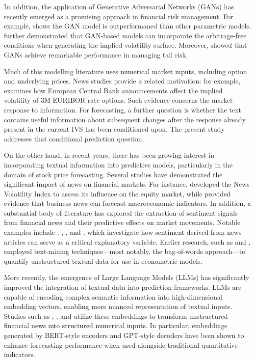 In addition, the application of Generative Adversarial Networks (GANs) has recently emerged as a promising approach in financial risk management. For example, \cite{ge2025gan} shows the GAN model is outperformaned than other parametric models. \cite{vuletic2024volgan} further demonstrated that GAN-based models can incorporate the arbitrage-free conditions when generating the implied volatility surface. Moreover, \cite{cont2025tail} showed that GANs achieve remarkable performance in managing tail risk.



Much of this modelling literature uses numerical market inputs, including option and underlying prices. News studies provide a related motivation: for example, \cite{vergote2012} examines how European Central Bank announcements affect the implied volatility of 3M EURIBOR rate options. Such evidence concerns the market response to information. For forecasting, a further question is whether the text contains useful information about subsequent changes after the response already present in the current IVS has been conditioned upon. The present study addresses that conditional prediction question.




On the other hand, in recent years, there has been growing interest in incorporating textual information into predictive models, particularly in the domain of stock price forecasting. Several studies have demonstrated the significant impact of news on financial markets. For instance, \cite{manela2017news} developed the News Volatility Index to assess its influence on the equity market, while \cite{bybee2024business} provided evidence that business news can forecast macroeconomic indicators. In addition, a substantial body of literature has explored the extraction of sentiment signals from financial news and their predictive effects on market movements. Notable examples include \cite{schumaker2009quantitative}, \cite{hagenau2012automated}, \cite{ke2019predicting}, and \cite{li2020incorporating}, which investigate how sentiment derived from news articles can serve as a critical explanatory variable. Earlier research, such as \cite{schumaker2009textual} and \cite{de2014evaluating}, employed text-mining techniques—most notably, the bag-of-words approach—to quantify unstructured textual data for use in econometric models.


More recently, the emergence of Large Language Models (LLMs) has significantly improved the integration of textual data into prediction frameworks. LLMs are capable of encoding complex semantic information into high-dimensional embedding vectors, enabling more nuanced representation of textual inputs. Studies such as \cite{chen2021stock}, \cite{ji2021stock}, and \cite{chen2022expected} utilize these embeddings to transform unstructured financial news into structured numerical inputs. In particular, embeddings generated by BERT-style encoders and GPT-style decoders have been shown to enhance forecasting performance when used alongside traditional quantitative indicators.



